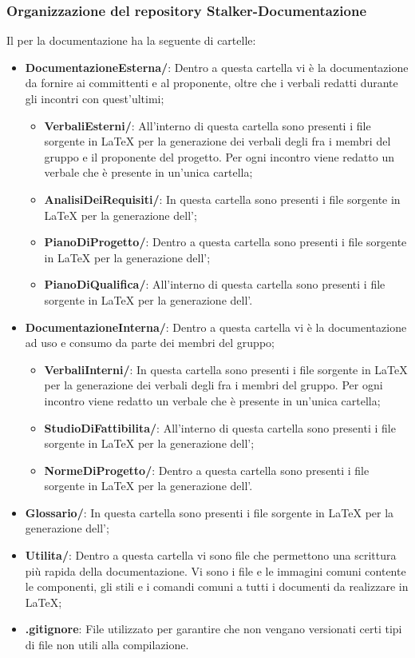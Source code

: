 \subsubsection{Organizzazione del repository Stalker-Documentazione}
Il  per la documentazione ha la seguente  di cartelle:
\begin{itemize}
	\item \textbf{DocumentazioneEsterna/}: Dentro a questa cartella vi è la documentazione da fornire ai committenti e al proponente, oltre che i verbali redatti durante gli incontri con quest'ultimi;
	\begin{itemize}
		\item \textbf{VerbaliEsterni/}: All'interno di questa cartella sono presenti i file sorgente in \LaTeX{} per la generazione dei verbali degli  fra i membri del gruppo e il proponente del progetto.
		Per ogni incontro viene redatto un verbale che è presente in un'unica cartella;
		\item \textbf{AnalisiDeiRequisiti/}: In questa cartella sono presenti i file sorgente in \LaTeX{} per la generazione dell'\AdR{};
		\item \textbf{PianoDiProgetto/}: Dentro a questa cartella sono presenti i file sorgente in \LaTeX{} per la generazione dell'\PdP{};
		\item \textbf{PianoDiQualifica/}: All'interno di questa cartella sono presenti i file sorgente in \LaTeX{} per la generazione dell'\PdQ{}.
	\end{itemize}
	\item \textbf{DocumentazioneInterna/}: Dentro a questa cartella vi è la documentazione ad uso e consumo da parte dei membri del gruppo;
	\begin{itemize}
		\item \textbf{VerbaliInterni/}: In questa cartella sono presenti i file sorgente in \LaTeX{} per la generazione dei verbali degli  fra i membri del gruppo.
		Per ogni incontro viene redatto un verbale che è presente in un'unica cartella;
		\item \textbf{StudioDiFattibilita/}: All'interno di questa cartella sono presenti i file sorgente in \LaTeX{} per la generazione dell'\SdF{};
		\item \textbf{NormeDiProgetto/}: Dentro a questa cartella sono presenti i file sorgente in \LaTeX{} per la generazione dell'\NdP{}.
	\end{itemize}	
	\item \textbf{Glossario/}: In questa cartella sono presenti i file sorgente in \LaTeX{} per la generazione dell'\Glossario{};
	\item \textbf{Utilita/}: Dentro a questa cartella vi sono file che permettono una scrittura più rapida della documentazione.
	Vi sono i file e le immagini comuni contente le componenti, gli stili e i comandi comuni a tutti i documenti da realizzare in \LaTeX{};
	\item \textbf{.gitignore}: File utilizzato per garantire che non vengano versionati certi tipi di file non utili alla compilazione.
\end{itemize}


